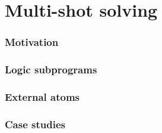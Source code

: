 \part{Multi-shot solving}
\section{Motivation}

\section{Logic subprograms}


\section{External atoms}


% 
% 
\section{Case studies}
